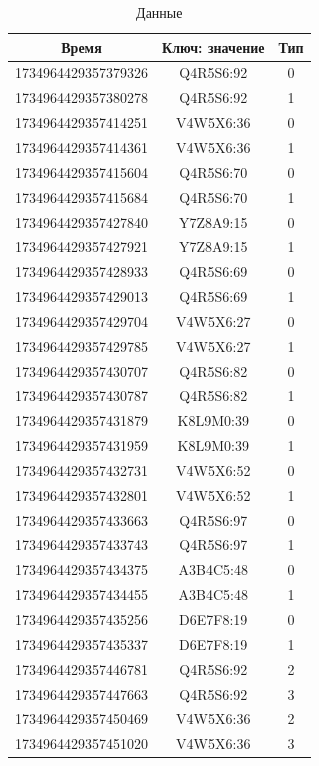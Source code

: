 \begin{table}[h]
	\centering
	\caption{Данные}
	\begin{tabular}{| c | c | c |}
		\hline
		Время & Ключ: значение & Тип \\\hline
		1734964429357379326 & Q4R5S6:92 & 0 \\\hline
		1734964429357380278 & Q4R5S6:92 & 1 \\\hline
		1734964429357414251 & V4W5X6:36 & 0 \\\hline
		1734964429357414361 & V4W5X6:36 & 1 \\\hline
		1734964429357415604 & Q4R5S6:70 & 0 \\\hline
		1734964429357415684 & Q4R5S6:70 & 1 \\\hline
		1734964429357427840 & Y7Z8A9:15 & 0 \\\hline
		1734964429357427921 & Y7Z8A9:15 & 1 \\\hline
		1734964429357428933 & Q4R5S6:69 & 0 \\\hline
		1734964429357429013 & Q4R5S6:69 & 1 \\\hline
		1734964429357429704 & V4W5X6:27 & 0 \\\hline
		1734964429357429785 & V4W5X6:27 & 1 \\\hline
		1734964429357430707 & Q4R5S6:82 & 0 \\\hline
		1734964429357430787 & Q4R5S6:82 & 1 \\\hline
		1734964429357431879 & K8L9M0:39 & 0 \\\hline
		1734964429357431959 & K8L9M0:39 & 1 \\\hline
		1734964429357432731 & V4W5X6:52 & 0 \\\hline
		1734964429357432801 & V4W5X6:52 & 1 \\\hline
		1734964429357433663 & Q4R5S6:97 & 0 \\\hline
		1734964429357433743 & Q4R5S6:97 & 1 \\\hline
		1734964429357434375 & A3B4C5:48 & 0 \\\hline
		1734964429357434455 & A3B4C5:48 & 1 \\\hline
		1734964429357435256 & D6E7F8:19 & 0 \\\hline
		1734964429357435337 & D6E7F8:19 & 1 \\\hline
		1734964429357446781 & Q4R5S6:92 & 2 \\\hline
		1734964429357447663 & Q4R5S6:92 & 3 \\\hline
		1734964429357450469 & V4W5X6:36 & 2 \\\hline
		1734964429357451020 & V4W5X6:36 & 3 \\\hline

\end{tabular}
\end{table}
